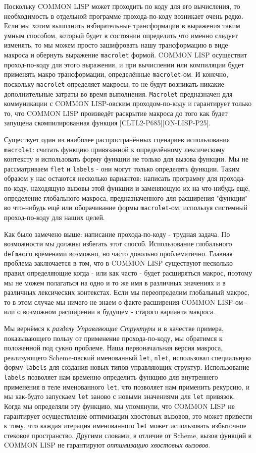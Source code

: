Поскольку COMMON LISP может проходить по коду для его вычисления, то необходимость в отдельной программе прохода-по-коду возникает очень редко. Если мы хотим выполнить избирательные трансформации в выражения таким умным способом, который будет в состоянии определить что именно следует изменять, то мы можем просто зашифровать нашу трансформацию в виде макроса и обернуть выражение \verb"macrolet" формой. COMMON LISP осуществит проход-по-коду для этого выражения, и при вычислении или компиляции будет применять макро трансформации, определённые \verb"macrolet"-ом. И конечно, поскольку \verb"macrolet" определяет макросы, то не будут возникать никакие дополнительные затраты во время выполнения. \verb"Macrolet" предназначен для коммуникации с COMMON LISP-овским проходом-по-коду и гарантирует только то, что COMMON LISP произведёт раскрытие макроса до того как будет запущена скомпилированная функция [CLTL2-P685][ON-LISP-P25].

Существует один из наиболее распространённых сценариев использования \verb"macrolet": считать функцию привязанной к определённому лексическому контексту и использовать форму функции не только для вызова функции. Мы не рассматриваем \verb"flet" и \verb"labels" - они могут только определять функции. Таким образом у нас остаются несколько вариантов: написать программу для прохода-по-коду, находящую вызовы этой функции и заменяющую их на что-нибудь ещё, определение глобального макроса, предназначенного для расширения "функции" во что-нибудь ещё или оборачивание формы \verb"macrolet"-ом, используя системный проход-по-коду для наших целей.

Как было замечено выше: написание прохода-по-коду - трудная задача. По возможности мы должны избегать этот способ. Использование глобального \verb"defmacro" временами возможно, но часто довольно проблематично. Главная проблема заключается в том, что в COMMON LISP существуют несколько правил определяющие когда - или как часто - будет расширяться макрос, поэтому мы не можем полагаться на одно и то же имя в различных значениях и в различных лексических контекстах. Если мы переопределим глобальный макрос, то в этом случае мы ничего не знаем о факте расширения COMMON LISP-ом - или о возможном расширении в будущем - старого варианта макроса.

Мы вернёмся к \emph{разделу Управляющие Структуры} и в качестве примера, показывающего пользу от применение прохода-по-коду, мы обратимся к положенной под сукно проблеме. Наша первоначальная версия макроса, реализующего Scheme-овский именованный \verb"let", \verb"nlet", использовал специальную форму \verb"labels" для создания новых типов управляющих структур. Использование \verb"labels" позволяет нам временно определить функцию для внутреннего применения в теле именованного \verb"let", что позволяет нам применить рекурсию, и мы как-будто запускаем \verb"let" заново с новыми значениями для \verb"let" привязок. Когда мы определяли эту функцию, мы упомянули, что COMMON LISP не гарантирует осуществление оптимизации хвостовых вызовов, это может привести к тому, что каждая итерация именованного \verb"let" может использовать избыточное стековое пространство. Другими словами, в отличие от Scheme, вызов функций в COMMON LISP не гарантируют \emph{оптимизацию хвостовых вызовов}.

